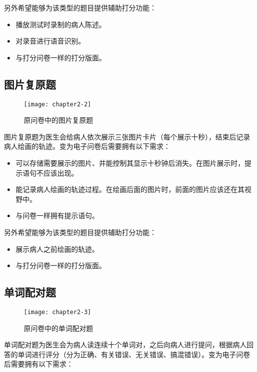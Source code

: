 另外希望能够为该类型的题目提供辅助打分功能：

\begin{itemize}
\item 播放测试时录制的病人陈述。
\item	对录音进行语音识别。
\item	与打分问卷一样的打分版面。
\end{itemize}

\subsection{图片复原题}

\begin{figure}[h]
  \centering
  \texttt{[image: chapter2-2]}
  \caption{原问卷中的图片复原题}
\end{figure}

图片复原题为医生会给病人依次展示三张图片卡片（每个展示十秒），结束后记录病人绘画的轨迹。变为电子问卷后需要拥有以下需求：

\begin{itemize}
\item 可以存储需要展示的图片、并能控制其显示十秒钟后消失。在图片展示时，提示语句不应该出现。
\item	能记录病人绘画的轨迹过程。在绘画后面的图片时，前面的图片应该还在其视野中。
\item 与问卷一样拥有提示语句。
\end{itemize}

另外希望能够为该类型的题目提供辅助打分功能：

\begin{itemize}
\item 展示病人之前绘画的轨迹。
\item	与打分问卷一样的打分版面。
\end{itemize}

\subsection{单词配对题}

\begin{figure}[h]
  \centering
  \texttt{[image: chapter2-3]}
  \caption{原问卷中的单词配对题}
\end{figure}

单词配对题为医生会为病人读连续十个单词对，之后向病人进行提问，根据病人回答的单词进行评分（分为正确、有关错误、无关错误、搞混错误）。变为电子问卷后需要拥有以下需求：

